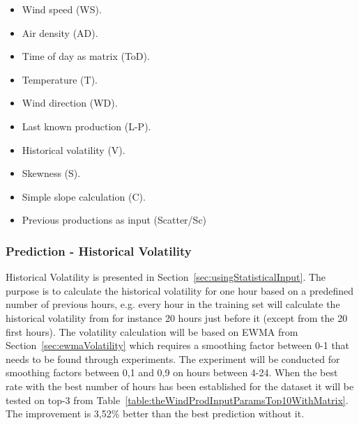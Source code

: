 \begin{itemize}
\item Wind speed (WS).
\item Air density (AD).
\item Time of day as matrix (ToD).
\item Temperature (T).
\item Wind direction (WD).
\item Last known production (L-P).
\item Historical volatility (V).
\item Skewness (S).
\item Simple slope calculation (C).
\item Previous productions as input (Scatter/Sc)
\end{itemize}

\subsubsection{Prediction - Historical Volatility}
Historical Volatility is presented in Section~\ref{sec:usingStatisticalInput}. The purpose is to calculate the historical volatility for one hour based on a predefined number of previous hours, e.g. every hour in the training set will calculate the historical volatility from for instance 20 hours just before it (except from the 20 first hours). The volatility calculation will be based on EWMA from Section~\ref{sec:ewmaVolatility} which requires a smoothing factor between 0-1 that needs to be found through experiments. The experiment will be conducted for smoothing factors between 0,1 and 0,9 on hours between 4-24. When the best rate with the best number of hours has been established for the dataset it will be tested on top-3 from Table~\ref{table:theWindProdInputParamsTop10WithMatrix}. The improvement is 3,52\% better than the best prediction without it. 

